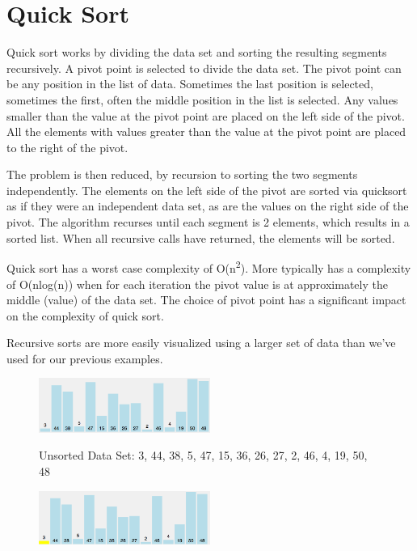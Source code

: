 \section{Quick Sort}
Quick sort works by dividing the data set and sorting the  resulting segments recursively. 
A pivot point is selected to divide the data set.  The pivot point can be any position in the list of data.  Sometimes the last position is selected, sometimes the first,  often the middle position in the list is selected.   Any values smaller than the value at the  pivot  point are placed on the left side of the pivot.  All the elements with values greater than the value at the pivot point are placed to the right of the pivot.

The problem is then reduced, by recursion to sorting the two segments independently.   The elements on the left side of the pivot are sorted via quicksort as if they were an independent data set, as are the values on the right side of the pivot.   The algorithm recurses until each segment is 2 elements, which results in a sorted list.   When all recursive calls have returned,  the elements will be sorted.



Quick sort has a worst case complexity of O(n\textsuperscript{2}). More typically has a complexity of O(nlog(n)) when for each iteration the pivot value is at approximately the middle (value) of the data set.    The choice of pivot point has a significant impact on the complexity of quick sort.

Recursive sorts are more easily visualized using a larger set of data than we've used for our previous examples.  




\begin{figure}[H]
\centering
\includegraphics[width=0.5\textwidth]{pictures/quick1.png}
\label{fig:quick1}
\caption{Unsorted Data Set: 3, 44, 38, 5, 47, 15, 36, 26, 27, 2, 46, 4, 19, 50, 48}
\end{figure}

\begin{figure}[H]
\centering
\includegraphics[width=0.5\textwidth]{pictures/quick2.png}
\label{fig:quick2}
\end{figure}


